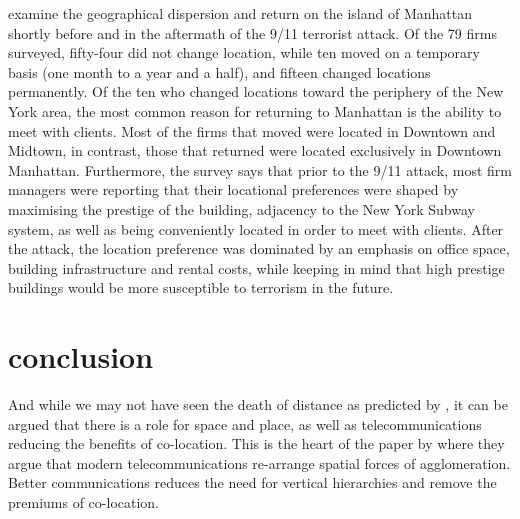 \cite{gongthe2012} examine the geographical dispersion and return on the island of Manhattan shortly before and in the aftermath of the 9/11 terrorist attack. Of the 79 firms surveyed, fifty-four did not change location, while ten moved on a temporary basis (one month to a year and a half), and fifteen changed locations permanently.  Of the ten who changed locations toward the periphery of the New York area, the most common reason for returning to Manhattan is the ability to meet with clients.  Most of the firms that moved were located in Downtown and Midtown, in contrast,  those that returned were located exclusively in Downtown Manhattan. Furthermore, the survey says that prior to the 9/11 attack, most firm managers were reporting that their locational preferences were shaped by maximising the prestige of the building, adjacency to the New York Subway system, as well as being conveniently located in order to meet with clients.    After the attack, the location preference was dominated by an emphasis on office space, building infrastructure and rental costs, while keeping in mind that high prestige buildings would be more susceptible to terrorism in the future.  
	
\section{conclusion}	

And while we may not have seen the death of distance as predicted by \cite{Obrian1992}, it can be argued that there is a role for space and place, as well as telecommunications reducing the benefits of co-location. This is the heart of the paper by \cite{Moriset2009} where they argue that modern telecommunications re-arrange spatial forces of agglomeration.  Better communications reduces the need for vertical hierarchies and remove the premiums of co-location. 
	
	